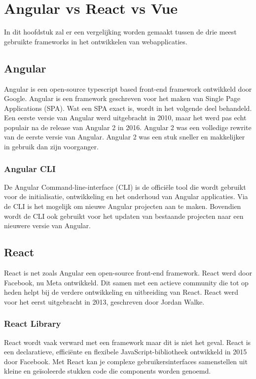 \section{Angular vs React vs Vue}%
In dit hoofdstuk zal er een vergelijking worden gemaakt tussen de drie meest
gebruikte frameworks in het ontwikkelen van webapplicaties.

\subsection*{Angular}%
Angular is een open-source typescript based front-end framework ontwikkeld door
Google. Angular is een framework geschreven voor het maken van Single Page
Applications (SPA). Wat een SPA exact is, wordt in het volgende deel behandeld.
\bigbreak Een eerste versie van Angular werd uitgebracht in 2010, maar het werd
pas echt populair na de release van Angular 2 in 2016. Angular 2 was een
volledige rewrite van de eerste versie van Angular. Angular 2 was een stuk
sneller en makkelijker in gebruik dan zijn voorganger. \autocite{DeNeve2021}

\subsubsection{Angular CLI}
De Angular Command-line-interface (CLI) is de officiële tool die wordt gebruikt
voor de initialisatie, ontwikkeling en het onderhoud van Angular applicaties.
Via de CLI is het mogelijk om nieuwe Angular projecten aan te maken. Bovendien
wordt de CLI ook gebruikt voor het updaten van bestaande projecten naar een
nieuwere versie van Angular.

\subsection*{React}%
React is net zoals Angular een open-source \textcite{React2024} front-end
framework. React werd door Facebook, nu Meta ontwikkeld. Dit samen met een
actieve community die tot op heden helpt bij de verdere ontwikkeling en
uitbreiding van React. React werd voor het eerst uitgebracht in 2013,
geschreven door Jordan Walke.

\subsubsection*{React Library}%
React wordt vaak verward met een framework maar dit is niet het geval. \autocite{Boloorchi2017} React is een declaratieve, efficiënte en flexibele JavaScript-bibliotheek ontwikkeld in 2015 door Facebook. Met React kan je complexe ge\-bruik\-er\-sin\-ter\-fa\-ces samen\-stellen uit kleine en ge\-ïso\-leerde stuk\-ken code die comp\-onents worden genoemd.

